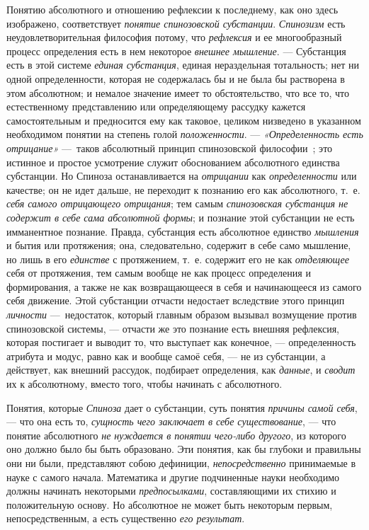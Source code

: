 Понятию абсолютного и отношению рефлексии к последнему, как оно здесь
изображено, соответствует {\em понятие спинозовской
субстанции}. {\em Спинозизм} есть неудовлетворительная
философия потому, что {\em рефлексия} и ее
многообразный процесс определения есть в нем некоторое
{\em внешнее мышление}. — Субстанция есть в этой
системе {\em единая субстанция}, единая нераздельная
тотальность; нет ни одной определенности, которая не содержалась бы и не
была бы растворена в этом абсолютном; и немалое значение имеет то
обстоятельство, что все то, что естественному представлению или
определяющему рассудку кажется самостоятельным и предносится ему как
таковое, целиком низведено в указанном необходимом понятии на степень голой
{\em положенности}. —
{\em «Определенность есть отрицание»} —~таков
абсолютный принцип спинозовской
философии~\textstyleEndnodeLink{(\ref{bkm:Ref474669620}}\label{bkm:bm91}\textstyleEndnodeLink{)};
это истинное и простое усмотрение служит обоснованием абсолютного единства
субстанции. Но Спиноза останавливается на
{\em отрицании} как
{\em определенности} или качестве; он не идет дальше,
не переходит к познанию его как абсолютного, т.~е.
{\em себя самого отрицающего отрицания}; тем самым
{\em спинозовская субстанция не содержит в себе сама
абсолютной формы}; и познание этой субстанции не есть имманентное познание.
Правда, субстанция есть абсолютное единство
{\em мышления} и бытия или протяжения; она,
следовательно, содержит в себе само мышление, но лишь в его
{\em единстве} с протяжением, т.~е. содержит его не как
{\em отделяющее} себя от протяжения, тем самым вообще
не как процесс определения и формирования, а также не как возвращающееся в
себя и начинающееся из самого себя движение. Этой субстанции отчасти
недостает вследствие этого принцип {\em личности}
—~недостаток, который главным образом вызывал возмущение против
спинозовской системы, — отчасти же это познание есть внешняя рефлексия,
которая постигает и выводит то, что выступает как конечное, —
определенность атрибута и модус, равно как и вообще самоё себя, — не из
субстанции, а действует, как внешний рассудок, подбирает определения, как
{\em данные}, и {\em сводит} их к
абсолютному, вместо того, чтобы начинать с абсолютного.

Понятия, которые {\em Спиноза} дает о субстанции, суть
понятия {\em причины самой себя}, — что она есть то,
{\em сущность чего заключает в себе существование}, —
что понятие абсолютного {\em не нуждается в понятии
чего-либо другого}, из которого оно должно было бы быть образовано. Эти
понятия, как бы глубоки и правильны они ни были, представляют собою
дефиниции, {\em непосредственно} принимаемые в науке с
самого начала. Математика и другие подчиненные науки необходимо должны
начинать некоторыми {\em предпосылками}, составляющими
их стихию и положительную основу. Но абсолютное не может быть некоторым
первым, непосредственным, а есть существенно {\em его
результат}.

